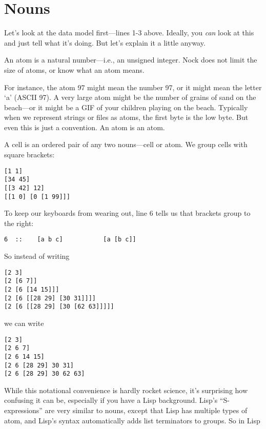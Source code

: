\section{Nouns}

Let's look at the data model first---lines 1-3 above.  Ideally,
you \emph{can} look at this and just tell what it's doing.  But let's
explain it a little anyway.

An atom is a natural number---i.e., an unsigned integer.  Nock does
not limit the size of atoms, or know what an atom means.

For instance, the atom 97 might mean the number 97, or it might
mean the letter `a' (ASCII 97).  A very large atom might be the
number of grains of sand on the beach---or it might be a GIF of
your children playing on the beach.  Typically when we represent
strings or files as atoms, the first byte is the low byte.  But
even this is just a convention.  An atom is an atom.

A cell is an ordered pair of any two nouns---cell or atom.  We
group cells with square brackets:

\begin{framed_shaded}
\begin{Verbatim}[fontsize=\relsize{-2.5},fontseries=b,commandchars=\\\{\}]
[1 1]
[34 45]
[[3 42] 12]
[[1 0] [0 [1 99]]]
\end{Verbatim}
\end{framed_shaded}
To keep our keyboards from wearing out, line 6 tells us that
brackets group to the right:

\begin{framed_shaded}
\begin{Verbatim}[fontsize=\relsize{-2.5},fontseries=b,commandchars=\\\{\}]
6  ::    [a b c]           [a [b c]]
\end{Verbatim}
\end{framed_shaded}
So instead of writing

\begin{framed_shaded}
\begin{Verbatim}[fontsize=\relsize{-2.5},fontseries=b,commandchars=\\\{\}]
[2 3]
[2 [6 7]]
[2 [6 [14 15]]]
[2 [6 [[28 29] [30 31]]]]
[2 [6 [[28 29] [30 [62 63]]]]]
\end{Verbatim}
\end{framed_shaded}
we can write

\begin{framed_shaded}
\begin{Verbatim}[fontsize=\relsize{-2.5},fontseries=b,commandchars=\\\{\}]
[2 3]
[2 6 7]
[2 6 14 15]
[2 6 [28 29] 30 31]
[2 6 [28 29] 30 62 63]
\end{Verbatim}
\end{framed_shaded}
While this notational convenience is hardly rocket science, it's
surprising how confusing it can be, especially if you have a Lisp
background.  Lisp's ``S-expressions'' are very similar to nouns,
except that Lisp has multiple types of atom, and Lisp's syntax
automatically adds list terminators to groups.  So in Lisp

